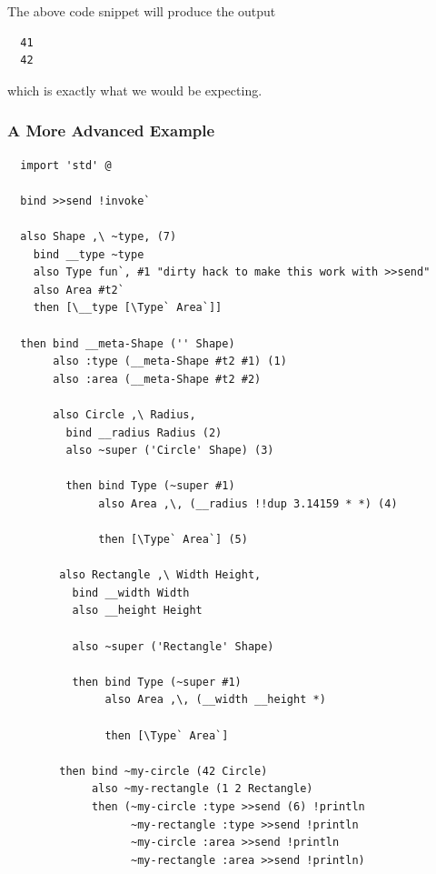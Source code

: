 \documentclass{report}
\begin{document}
The above code snippet will produce the output
\begin{verbatim}
  41
  42
\end{verbatim}

which is exactly what we would be expecting.

\subsubsection{A More Advanced Example}

\begin{mdframed}[style=example]
\begin{verbatim}
  import 'std' @

  bind >>send !invoke`

  also Shape ,\ ~type, (7)
    bind __type ~type
    also Type fun`, #1 "dirty hack to make this work with >>send"
    also Area #t2`
    then [\__type [\Type` Area`]]

  then bind __meta-Shape ('' Shape)
       also :type (__meta-Shape #t2 #1) (1)
       also :area (__meta-Shape #t2 #2)

       also Circle ,\ Radius,
         bind __radius Radius (2)
         also ~super ('Circle' Shape) (3)

         then bind Type (~super #1)
              also Area ,\, (__radius !!dup 3.14159 * *) (4)

              then [\Type` Area`] (5)

        also Rectangle ,\ Width Height,
          bind __width Width
          also __height Height

          also ~super ('Rectangle' Shape)

          then bind Type (~super #1)
               also Area ,\, (__width __height *)
  
               then [\Type` Area`]

        then bind ~my-circle (42 Circle)
             also ~my-rectangle (1 2 Rectangle)
             then (~my-circle :type >>send (6) !println
                   ~my-rectangle :type >>send !println
                   ~my-circle :area >>send !println
                   ~my-rectangle :area >>send !println)
\end{verbatim}
\end{mdframed}
\end{document}
